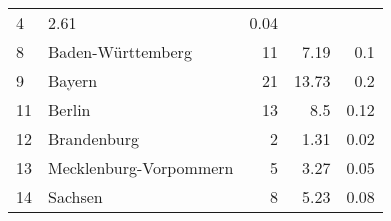 \begin{longtable}{lXrrr}
       \num{4} &
       \num[round-mode=places,round-precision=2]{2,61} &
         \num[round-mode=places,round-precision=2]{0,04} \\

     8 &
     \multicolumn{1}{X}{ Baden-Württemberg   } &


       \num{11} &
       \num[round-mode=places,round-precision=2]{7,19} &
         \num[round-mode=places,round-precision=2]{0,1} \\

     9 &
     \multicolumn{1}{X}{ Bayern   } &


       \num{21} &
       \num[round-mode=places,round-precision=2]{13,73} &
         \num[round-mode=places,round-precision=2]{0,2} \\

     11 &
     \multicolumn{1}{X}{ Berlin   } &


       \num{13} &
       \num[round-mode=places,round-precision=2]{8,5} &
         \num[round-mode=places,round-precision=2]{0,12} \\

     12 &
     \multicolumn{1}{X}{ Brandenburg   } &


       \num{2} &
       \num[round-mode=places,round-precision=2]{1,31} &
         \num[round-mode=places,round-precision=2]{0,02} \\

     13 &
     \multicolumn{1}{X}{ Mecklenburg-Vorpommern   } &


       \num{5} &
       \num[round-mode=places,round-precision=2]{3,27} &
         \num[round-mode=places,round-precision=2]{0,05} \\

     14 &
     \multicolumn{1}{X}{ Sachsen   } &


       \num{8} &
       \num[round-mode=places,round-precision=2]{5,23} &
         \num[round-mode=places,round-precision=2]{0,08} \\


\end{longtable}
